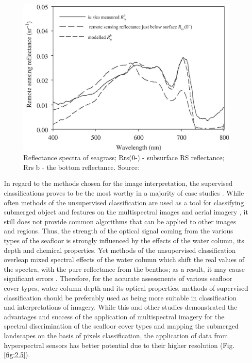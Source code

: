 \documentclass[11pt]{article}
\begin{document}
\begin{figure}
	\centering
	\includegraphics[scale=0.15]{Fig-15.jpg}
	\caption{Reflectance spectra of seagrass; Rrs(0-) - subsurface RS reflectance; Rrs b - the bottom
		reflectance. Source:\cite{Yang10}\label{Yang10}}
	\label{fig:2.6}
\end{figure}

In regard to the methods chosen for the image interpretation, the supervised classifications proves to
be the most worthy in a majority of case studies \cite{Palandro03,Peneva08}\label{Palandro03}\label{Peneva08}. While
often methods of the unsupervised classification are used as a tool for classifying submerged object
and features on the multispectral images and aerial imagery \cite{Fletcher09}\label{Fletcher09}, it still does not
provide common algorithms that can be applied to other images and regions. Thus, the strength of the
optical signal coming from the various types of the seafloor is strongly influenced by the effects of the
water column, its depth and chemical properties. Yet methods of the unsupervised classification
overleap mixed spectral effects of the water column which shift the real values of the spectra, with the
pure reflectance from the benthos; as a result, it may cause significant errors \cite{Dierssen03}\label{Dierssen03}.
Therefore, for the accurate assessments of various seafloor cover types, water
column depth and its optical properties, methods of supervised classification should be preferably
used as being more suitable in classification and interpretations of imagery.
While this and other studies \cite{Phinn08}\label{Phinn08} demonstrated the advantages and success of the
application of multispectral imagery for the spectral discrimination of the seafloor cover types and
mapping the submerged landscapes on the basis of pixels classification, the application of data from
hyperspectral sensors has better potential due to their higher resolution (Fig.\ref{fig:2.5}).
\end{document}

